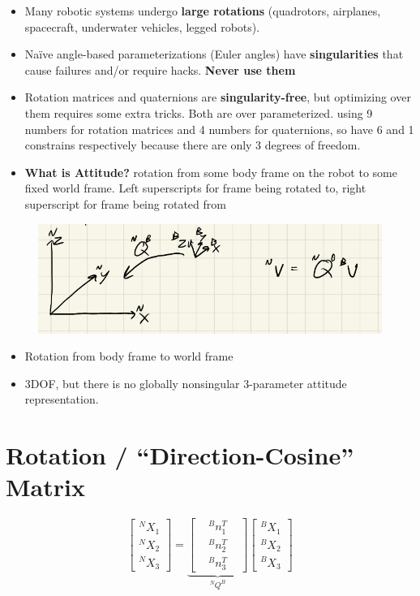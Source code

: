 \documentclass[11pt]{article}
\begin{document}
\begin{itemize}
    \item Many robotic systems undergo \textbf{large rotations} (quadrotors, airplanes, spacecraft, underwater vehicles, legged robots).
    \item Naïve angle-based parameterizations (Euler angles) have \textbf{singularities} that cause failures and/or require hacks. \textbf{Never use them}
    \item Rotation matrices and quaternions are \textbf{singularity-free}, but optimizing over them requires some extra tricks. Both are over parameterized. using 9 numbers for rotation matrices and 4 numbers for quaternions, so have 6 and 1 constrains respectively because there are only 3 degrees of freedom.
    \item \textbf{What is Attitude?}
    rotation from some body frame on the robot to some fixed world frame. Left superscripts for frame being rotated to, right superscript for frame being rotated from
\end{itemize}
\begin{figure}[H]
    \centering
    \includegraphics[width=\linewidth]{lecture_14_2.png}
\end{figure}
\begin{itemize}
    \item Rotation from body frame to world frame
    \item 3DOF, but there is no globally nonsingular 3-parameter attitude representation. 
\end{itemize}

\section*{Rotation / ``Direction-Cosine'' Matrix}

\[
\begin{bmatrix}
    ^N X_1 \\
    ^N X_2 \\
    ^N X_3
\end{bmatrix}
=
\underbrace{
\begin{bmatrix}
   & ^Bn_1^T& \\
    &^Bn_2^T &\\
   & ^Bn_3^T&
\end{bmatrix}
}_{^NQ^B}
\begin{bmatrix}
    ^B X_1 \\
    ^B X_2 \\
    ^B X_3
\end{bmatrix}
\]
\end{document}
